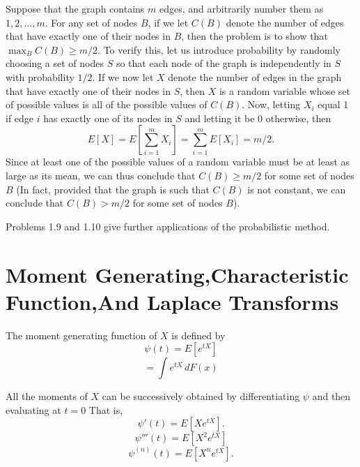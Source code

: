 \documentclass[lang=cn,10pt,thmcnt=section]{elegantbook}
\begin{document}
\begin{figure}[h]
	\centering
	\label{fig:graph}
\end{figure}

\begin{solution}
	Suppose that the graph contains \( m \) edges, and arbitrarily number them as \( 1, 2, \ldots, m \). For any set of nodes \( B \), if we let \( C(B) \) denote the number of edges that have exactly one of their nodes in \( B \), then the problem is to show that \( \max_{B} C(B) \geq m/2 \). To verify this, let us introduce probability by randomly choosing a set of nodes \( S \) so that each node of the graph is independently in \( S \) with probability \( 1/2 \). If we now let \( X \) denote the number of edges in the graph that have exactly one of their nodes in \( S \), then \( X \) is a random variable whose set of possible values is all of the possible values of \( C(B) \). Now, letting \( X_i \) equal 1 if edge \( i \) has exactly one of its nodes in \( S \) and letting it be 0 otherwise, then
	\[
	E[X] = E\left[\sum_{i=1}^{m} X_i\right] = \sum_{i=1}^{m} E[X_i] = m/2.
	\]
	Since at least one of the possible values of a random variable must be at least as large as its mean, we can thus conclude that \( C(B) \geq m/2 \) for some set of nodes \( B \) (In fact, provided that the graph is such that \( C(B) \) is not constant, we can conclude that \( C(B) > m/2 \) for some set of nodes \( B \)).
	
	Problems 1.9 and 1.10 give further applications of the probabilistic method.
\end{solution}
\section{Moment Generating,Characteristic Function,And Laplace Transforms}

The moment generating function of \(X\) is defined by
\[
\psi(t) = E[e^{tX}]
\]
\[
= \int e^{tX} \, dF(x)
\]

All the moments of \(X\) can be successively obtained by differentiating \(\psi\) and then evaluating at \(t = 0\) That is,
\[
\psi'(t) = E[X e^{tX}].
\]
\[
\psi'''(t) = E[X^2 e^{tX}]
\]
\[
\psi^{(n)}(t) = E[X^n e^{tX}].
\]
\end{document}
